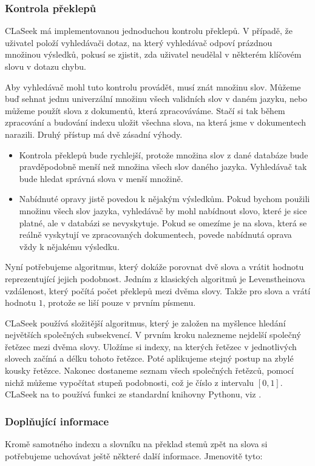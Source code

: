 \documentclass[12pt]{article}
\newcommand{\name}{CLaSeek}
\newcommand{\sssection}[1]{\subsubsection{#1}}
\begin{document}
\sssection{Kontrola překlepů}
\name{} má implementovanou jednoduchou kontrolu překlepů. V případě, že uživatel položí vyhledávači dotaz, na který vyhledávač odpoví prázdnou množinou výsledků, pokusí se zjistit, zda uživatel neudělal v některém klíčovém slovu v dotazu chybu. 

Aby vyhledávač mohl tuto kontrolu provádět, musí znát množinu  slov. Můžeme buď sehnat jednu univerzální množinu všech validních slov v daném jazyku, nebo můžeme použít slova z dokumentů, která zpracováváme. Stačí si tak během zpracování a budování indexu uložit všechna slova, na která jsme v dokumentech narazili. Druhý přístup má dvě zásadní výhody.

\begin{itemize}
	\item Kontrola překlepů bude rychlejší, protože množina slov z dané databáze bude pravděpodobně menší než množina všech slov daného jazyka. Vyhledávač tak bude hledat správná slova v menší množině. 
	\item Nabídnuté opravy jistě povedou k nějakým výsledkům. Pokud bychom použili množinu všech slov jazyka, vyhledávač by mohl nabídnout slovo, které je sice platné, ale v databázi se nevyskytuje. Pokud se omezíme je na slova, která se reálně vyskytují ve zpracovaných dokumentech, povede nabídnutá oprava vždy k nějakému výsledku.
\end{itemize}

Nyní potřebujeme algoritmus, který dokáže porovnat dvě slova a vrátit hodnotu reprezentující jejich podobnost. Jedním z klasických algoritmů je Levenstheinova vzdálenost, který počítá počet překlepů mezi dvěma slovy. Takže pro slova  a  vrátí hodnotu $1$, protože se liší pouze v prvním písmenu. 

\name{} používá složitější algoritmus, který je založen na myšlence hledání největších společných subsekvencí. V prvním kroku nalezneme nejdelší společný řetězec mezi dvěma slovy. Uložíme si indexy, na kterých řetězec v jednotlivých slovech začíná a délku tohoto řetězce. Poté aplikujeme stejný postup na zbylé kousky řetězce. Nakonec dostaneme seznam všech společných řetězců, pomocí nichž můžeme vypočítat stupeň podobnosti, což je číslo z intervalu $[0, 1]$. \name{} na to používá funkci ze standardní knihovny Pythonu, viz \cite{pydiff}.



\sssection{Doplňující informace}
Kromě samotného indexu a slovníku na překlad stemů zpět na slova si potřebujeme uchovávat ještě některé další informace. Jmenovitě tyto: 
\end{document}
